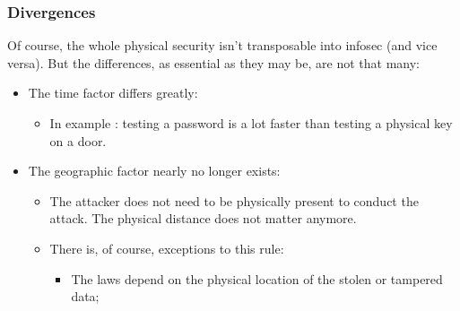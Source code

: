 \documentclass[11pt]{article} %
\begin{document}
\subsubsection{Divergences}

Of course, the whole physical security isn't transposable into infosec (and vice versa). But 
the differences, as essential as they may be, are not that many:
\begin{itemize}
\item The time factor differs greatly:
\begin{itemize}
\item In example : testing a password is a lot faster than testing a physical
key on a door. 
\end{itemize}
\item The geographic factor nearly no longer exists:
	\begin{itemize}
\item The attacker does not need to be physically present to conduct the attack. 
The physical distance does not matter anymore.
	\item There is, of course, exceptions to this rule:
		\begin{itemize}
\item The laws depend on the physical location of the stolen or 
tampered data;

\end{itemize}
\end{itemize}
\end{itemize}
\end{document}
